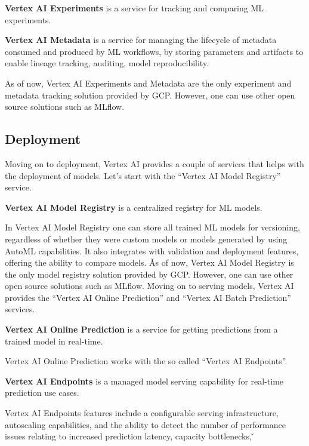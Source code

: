 \textbf{Vertex AI Experiments} is a service for tracking and comparing ML experiments.
\ed

\textbf{Vertex AI Metadata} is a service for managing the lifecycle of metadata consumed and produced by ML workflows,
by storing parameters and artifacts to enable lineage tracking, auditing, model reproducibility.
\ed

As of now, Vertex AI Experiments and Metadata are the only experiment and metadata tracking solution provided by GCP\@.
However, one can use other open source solutions such as MLflow.

\subsection{Deployment}

Moving on to deployment, Vertex AI provides a couple of services that helps with the deployment of models. Let's start
with the ``Vertex AI Model Registry'' service.

\textbf{Vertex AI Model Registry} is a centralized registry for ML models.
\ed

In Vertex AI Model Registry one can store all trained ML models for versioning, regardless of whether they were
custom models or models generated by using AutoML capabilities. It also integrates with validation and deployment
features, offering the ability to compare models. \v

As of now, Vertex AI Model Registry is the only model registry solution provided by GCP\@. However, one can use other
open source solutions such as MLflow. \v

Moving on to serving models, Vertex AI provides the ``Vertex AI Online Prediction'' and ``Vertex AI Batch Prediction''
services.

\textbf{Vertex AI Online Prediction} is a service for getting predictions from a trained model in real-time.
\ed

Vertex AI Online Prediction works with the so called ``Vertex AI Endpoints''.

\textbf{Vertex AI Endpoints} is a managed model serving capability for real-time prediction use cases.
\ed

Vertex AI Endpoints features include a configurable serving infrastructure, autoscaling capabilities, and the
ability to detect the number of performance issues relating to increased prediction latency, capacity bottlenecks, \v

